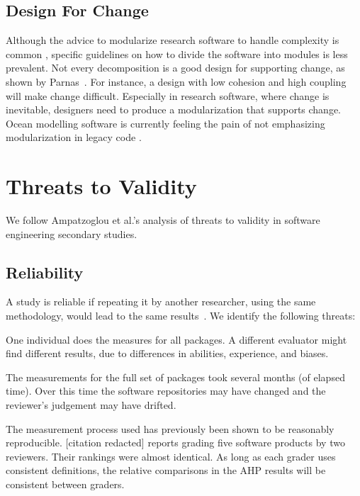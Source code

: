 \documentclass[doubleblind,12pt, 3p, times]{elsarticle}
\begin{document}
\subsection{Design For Change} \label{Sec_DesForChange}

Although the advice to modularize research software to handle
complexity is common \cite{WilsonEtAl2014, StewartEtAl2017, Storer2017},
specific guidelines on how to divide the software into modules is less
prevalent.  Not every decomposition is a good design for supporting change, as
shown by Parnas~\cite{Parnas1972a}.  For instance, a design with low cohesion and high
coupling \cite[p.\ 48]{GhezziEtAl2003} will make change difficult. Especially in
research software, where change is inevitable, designers need to produce a
modularization that supports change.  Ocean modelling software is currently
feeling the pain of not emphasizing modularization in legacy code
\cite{JungEtAl2022}.

\section{Threats to Validity} \label{sec_threats_to_validity}

We follow Ampatzoglou et al.'s \cite{AmpatzoglouEtAl2019} analysis of
threats to validity in software engineering secondary studies.

\subsection{Reliability}

A study is reliable if repeating it by another researcher, using the same
methodology, would lead to the same results~\cite{RunesonAndHost2009}.
We identify the following threats:
\begin{enumerate*}
\item One individual does the measures for all packages. A different
evaluator might find different results, due to differences in abilities,
experience, and biases.
\item The measurements for the full set of packages took several months (of
elapsed time).  Over this time the software repositories may have changed and
the reviewer's judgement may have drifted.
\end{enumerate*}

The measurement process used has previously been shown to be reasonably
reproducible.
[citation redacted] reports grading five software products by two reviewers.
Their rankings were almost identical. As long as each grader uses consistent
definitions, the relative comparisons in the AHP results will be consistent
between graders.
\end{document}
